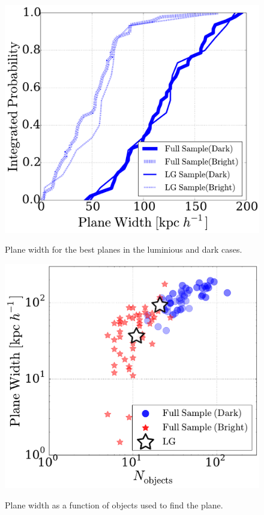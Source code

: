 \documentclass{emulateapj}
\begin{document}
\begin{figure}
\centering
\includegraphics[width=\hsize]{plane_width.pdf}\\
\caption{Plane width for the best planes in the luminious and dark cases.}
\label{fig:plane_width}
\end{figure}

\begin{figure}
\centering
\includegraphics[width=\hsize]{plane_width_n_dark.pdf}\\
\caption{Plane width as a function of objects used to find the plane.}
\label{fig:plane_width_nobjects}
\end{figure}
\end{document}
